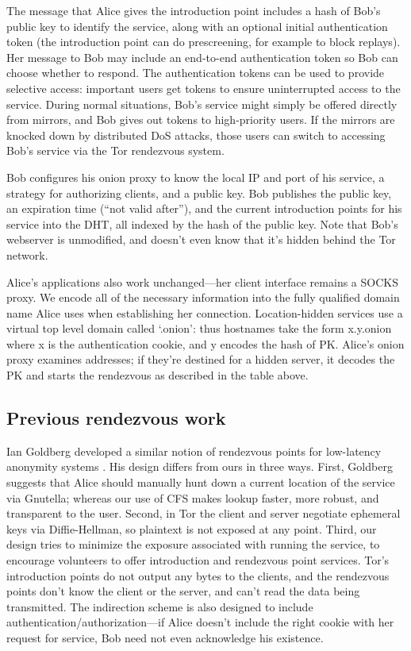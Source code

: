 \documentclass[times,10pt,twocolumn]{article}
\begin{document}
The message that Alice gives
the introduction point includes a hash of Bob's public key to identify
the service, along with an optional initial authentication token (the
introduction point can do prescreening, for example to block replays). Her
message to Bob may include an end-to-end authentication token so Bob
can choose whether to respond.
The authentication tokens can be used to provide selective access:
important users get tokens to ensure uninterrupted access to the
service. During normal situations, Bob's service might simply be offered
directly from mirrors, and Bob gives out tokens to high-priority users. If
the mirrors are knocked down by distributed DoS attacks, those users
can switch to accessing Bob's service via the Tor rendezvous system.


Bob configures his onion proxy to know the local IP and port of his
service, a strategy for authorizing clients, and a public key. Bob
publishes the public key, an expiration time (``not valid after''), and
the current introduction points for his service into the DHT, all indexed
by the hash of the public key. Note that Bob's webserver is unmodified,
and doesn't even know that it's hidden behind the Tor network.

Alice's applications also work unchanged---her client interface
remains a SOCKS proxy. We encode all of the necessary information
into the fully qualified domain name Alice uses when establishing her
connection. Location-hidden services use a virtual top level domain
called `.onion': thus hostnames take the form x.y.onion where x is the
authentication cookie, and y encodes the hash of PK. Alice's onion proxy
examines addresses; if they're destined for a hidden server, it decodes
the PK and starts the rendezvous as described in the table above.

\subsection{Previous rendezvous work}

Ian Goldberg developed a similar notion of rendezvous points for
low-latency anonymity systems \cite{ian-thesis}. His design differs from
ours in three ways. First, Goldberg suggests that Alice should manually
hunt down a current location of the service via Gnutella; whereas our
use of CFS makes lookup faster, more robust, and transparent to the
user. Second, in Tor the client and server negotiate ephemeral keys
via Diffie-Hellman, so plaintext is not exposed at any point. Third,
our design tries to minimize the exposure associated with running the
service, to encourage volunteers to offer introduction and rendezvous
point services. Tor's introduction points do not output any bytes to the
clients, and the rendezvous points don't know the client or the server,
and can't read the data being transmitted. The indirection scheme is
also designed to include authentication/authorization---if Alice doesn't
include the right cookie with her request for service, Bob need not even
acknowledge his existence.
\end{document}
